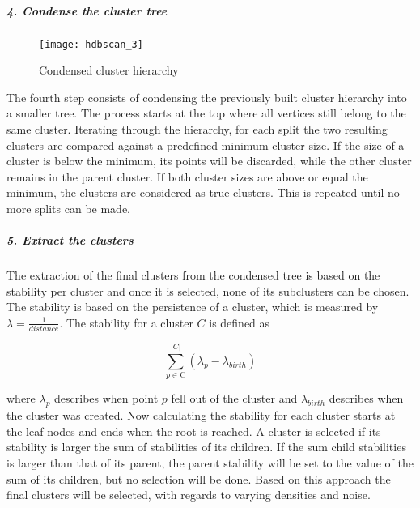 \subparagraph{4. Condense the cluster tree}

\begin{figure}[h]
    \centering
    \texttt{[image: hdbscan\_3]}
    \caption{Condensed cluster hierarchy}
    \label{fig:hdbscan_3}
\end{figure}

The fourth step consists of condensing the previously built cluster hierarchy into a smaller tree. The process starts at the top where all vertices still belong to the same cluster. Iterating through the hierarchy, for each split the two resulting clusters are compared against a predefined minimum cluster size. If the size of a cluster is below the minimum, its points will be discarded, while the other cluster remains in the parent cluster. If both cluster sizes are above or equal the minimum, the clusters are considered as true clusters. This is repeated until no more splits can be made. 


\subparagraph{5. Extract the clusters}

The extraction of the final clusters from the condensed tree is based on the stability per cluster and once it is selected, none of its subclusters can be chosen. The stability is based on the persistence of a cluster, which is measured by $\lambda = \frac{1}{distance}$. The stability for a cluster $C$ is defined as

\begin{equation}
\sum_{p \in \text{C}}^{|C|} ({\lambda}_{p} - {\lambda}_{birth})
\end{equation}

 where ${\lambda}_{p}$ describes when point $p$ fell out of the cluster and $ {\lambda}_{birth}$ describes when the cluster was created. Now calculating the stability for each cluster starts at the leaf nodes and ends when the root is reached. A cluster is selected if its stability is larger the sum of stabilities of its children. If the sum child stabilities is larger than that of its parent, the parent stability will be set to the value of the sum of its children, but no selection will be done. Based on this approach the final clusters will be selected, with regards to varying densities and noise.
